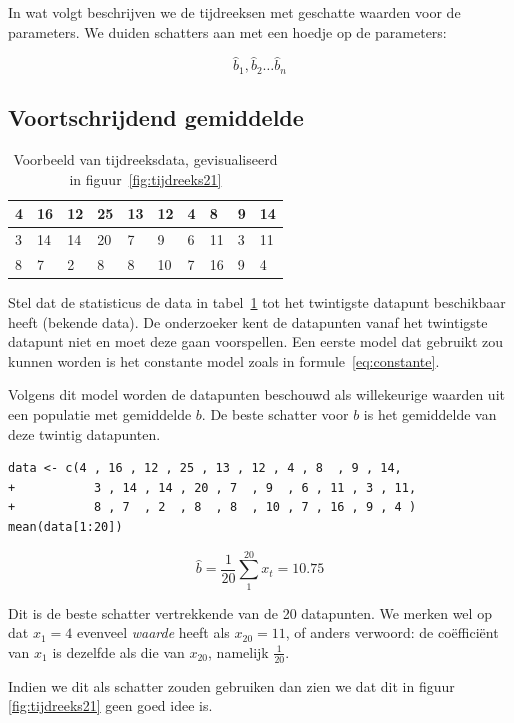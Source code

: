 In wat volgt beschrijven we de tijdreeksen met geschatte waarden voor de parameters. We duiden schatters aan met een hoedje op de parameters:

\[ \widehat{b}_{1}, \widehat{b}_{2} \dots \widehat{b}_{n} \] 

\subsection{Voortschrijdend gemiddelde}

\begin{table}
\centering
\begin{tabular}{|l|l|l|l|l|l|l|l|l|l|}
  \hline
  4 & 16 & 12 & 25 & 13 & 12 & 4 & 8  & 9 & 14 \\ \hline
  3 & 14 & 14 & 20 & 7  & 9  & 6 & 11 & 3 & 11 \\ \hline
  8 & 7  & 2  & 8  & 8  & 10 & 7 & 16 & 9 & 4  \\ \hline
\end{tabular}
\caption{Voorbeeld van tijdreeksdata, gevisualiseerd in figuur~\ref{fig:tijdreeks21}}
\label{tab:data-tijdreeks21}
\end{table}

Stel dat de statisticus de data in tabel~\ref{tab:data-tijdreeks21} tot het twintigste datapunt beschikbaar heeft (bekende data). De onderzoeker kent de datapunten vanaf het twintigste datapunt niet en moet deze gaan voorspellen. Een eerste model dat gebruikt zou kunnen worden is het constante model zoals in formule~\ref{eq:constante}. 

Volgens dit model worden de datapunten beschouwd als willekeurige waarden uit een populatie met gemiddelde $b$. De beste schatter voor $b$ is het gemiddelde van deze twintig datapunten. 

\begin{lstlisting}
data <- c(4 , 16 , 12 , 25 , 13 , 12 , 4 , 8  , 9 , 14, 
+           3 , 14 , 14 , 20 , 7  , 9  , 6 , 11 , 3 , 11, 
+           8 , 7  , 2  , 8  , 8  , 10 , 7 , 16 , 9 , 4 )
mean(data[1:20])
\end{lstlisting}

\[ \widehat{b} = \frac{1}{20} \sum_{1}^{20} x_{t}= 10.75 \] 

Dit is de beste schatter vertrekkende van de 20 datapunten. We merken wel op dat $x_{1} =  4$ evenveel \textit{waarde} heeft als $x_{20} = 11$, of anders verwoord: de coëfficiënt van $x_{1}$ is dezelfde als die van $x_{20}$, namelijk $\frac{1}{20}$.

Indien we dit als schatter zouden gebruiken dan zien we dat dit in figuur \ref{fig:tijdreeks21} geen goed idee is.

